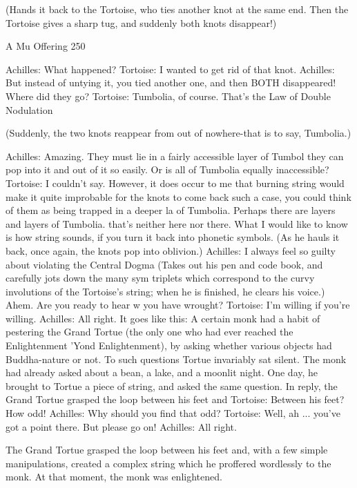    (Hands it back to the Tortoise, who ties another knot at the same end. Then the
   Tortoise gives a sharp tug, and suddenly both knots disappear!)




A Mu Offering                                                                            250

Achilles: What happened?
Tortoise: I wanted to get rid of that knot.
Achilles: But instead of untying it, you tied another one, and then BOTH disappeared!
   Where did they go?
Tortoise: Tumbolia, of course. That's the Law of Double Nodulation

   (Suddenly, the two knots reappear from out of nowhere-that is to say, Tumbolia.)

Achilles: Amazing. They must lie in a fairly accessible layer of Tumbol they can pop into
   it and out of it so easily. Or is all of Tumbolia equally inaccessible?
Tortoise: I couldn't say. However, it does occur to me that burning string would make it
   quite improbable for the knots to come back such a case, you could think of them as
   being trapped in a deeper la of Tumbolia. Perhaps there are layers and layers of
   Tumbolia. that's neither here nor there. What I would like to know is how string
   sounds, if you turn it back into phonetic symbols. (As he hauls it back, once again, the
   knots pop into oblivion.)
Achilles: I always feel so guilty about violating the Central Dogma (Takes out his pen
   and code book, and carefully jots down the many sym triplets which correspond to the
   curvy involutions of the Tortoise's string; when he is finished, he clears his voice.)
   Ahem. Are you ready to hear w you have wrought?
Tortoise: I'm willing if you're willing.
Achilles: All right. It goes like this:
A certain monk had a habit of pestering the Grand Tortue (the only one who had ever
   reached the Enlightenment 'Yond Enlightenment), by asking whether various objects
   had Buddha-nature or not. To such questions Tortue invariably sat silent. The monk
   had already asked about a bean, a lake, and a moonlit night. One day, he brought to
   Tortue a piece of string, and asked the same question. In reply, the Grand Tortue
   grasped the loop between his feet and
Tortoise: Between his feet? How odd! Achilles: Why should you find that odd?
Tortoise: Well, ah ... you've got a point there. But please go on!
Achilles: All right.

   The Grand Tortue grasped the loop between     his feet and, with a few simple
   manipulations, created a complex string which he proffered wordlessly to the
   monk. At that moment, the monk was enlightened.

